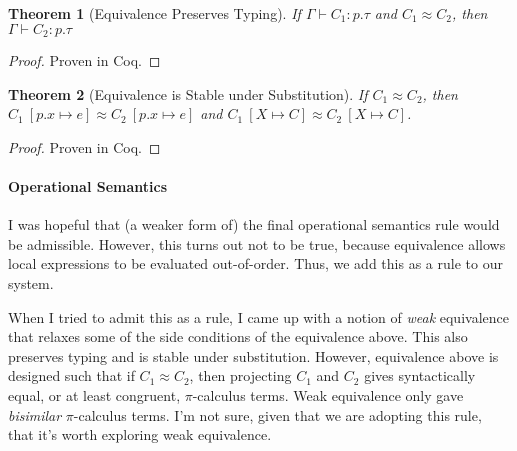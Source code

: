 \documentclass{article}
\newtheorem{thm}{Theorem}
\theoremstyle{definition}
\newcommand{\ett}{\textsf{true}}
\newcommand{\eff}{\textsf{false}}
\newcommand{\To}{\Rightarrow}
\newcommand{\subst}[3]{#1~[#2 \mapsto #3]}
\newcommand{\ceq}{\approx}
\newcommand{\own}[2]{#1.#2}
\newcommand{\send}[3][]{#2\nolinebreak \mathrel{\xrightarrow{#1}}\nolinebreak #3}
\newcommand{\cif}[3]{\textsf{if}~#1 \mathrel{\textsf{then}}\nolinebreak #2 \mathrel{\textsf{else}}\nolinebreak #3}
\newcommand{\clet}[2]{\textsf{let}~#1\nolinebreak =\nolinebreak #2 \mathrel{\textsf{in}}}
\newcommand{\proves}{\vdash}
\begin{document}
\begin{thm}[Equivalence Preserves Typing]
  \label{thm:equiv-pres-types}
  If $\Gamma \proves C_1 : p.\tau$ and $C_1 \ceq C_2$, then $\Gamma \proves C_2 : p.\tau$
\end{thm}
\begin{proof}
  Proven in Coq.
\end{proof}

\begin{thm}[Equivalence is Stable under Substitution]
  \label{thm:equiv-stable-subst}
  If $C_1 \ceq C_2$, then $\subst{C_1}{\own{p}{x}}{e} \ceq \subst{C_2}{\own{p}{x}}{e}$ and $\subst{C_1}{X}{C} \ceq \subst{C_2}{X}{C}$.
\end{thm}
\begin{proof}
  Proven in Coq.
\end{proof}

\paragraph{Operational Semantics}
\noindent{}

I was hopeful that (a weaker form of) the final operational semantics rule would be admissible.
However, this turns out not to be true, because equivalence allows local expressions to be evaluated out-of-order.
Thus, we add this as a rule to our system.

When I tried to admit this as a rule, I came up with a notion of \emph{weak} equivalence that relaxes some of the side conditions of the equivalence above.
This also preserves typing and is stable under substitution.
However, equivalence above is designed such that if $C_1 \ceq C_2$, then projecting $C_1$ and $C_2$ gives syntactically equal, or at least congruent, $\pi$-calculus terms.
Weak equivalence only gave \emph{bisimilar} $\pi$-calculus terms.
I'm not sure, given that we are adopting this rule, that it's worth exploring weak equivalence.
\end{document}
